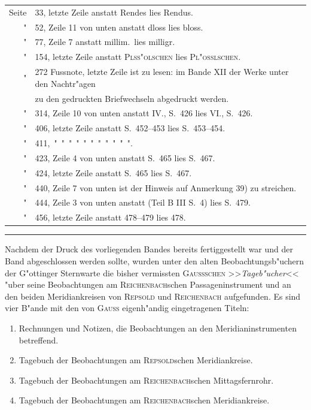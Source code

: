 \documentclass[12pt,a4paper]{article}
\theoremstyle{plain}
\theoremstyle{definition}
\theoremstyle{remark}
\begin{document}
\begin{tabular}{r@{\ }l}
Seite & 33, letzte Zeile anstatt Rendes lies Rendus. \\
\quad" & 52, Zeile 11 von unten anstatt dloss lies bloss. \\
\quad" & 77, Zeile 7 anstatt millim.\ lies milligr. \\
\quad" & 154, letzte Zeile anstatt \textsc{Plss"olschen} lies \textsc{Pl"osslschen}. \\
\quad" & 272 Fussnote, letzte Zeile ist zu lesen: im Bande XII der Werke unter den Nachtr"agen \\
& \qquad zu den gedruckten Briefwechseln abgedruckt werden. \\
\quad" & 314, Zeile 10 von unten anstatt IV., S.~426 lies VI., S.~426. \\
\quad" & 406, letzte Zeile anstatt S.~452--453 lies S.~453--454. \\
\quad" & 411, \quad\," \quad\," \quad\," \quad\," \quad\," \quad\," \quad\," \quad\," \quad\," \quad\," \quad\,". \\
\quad" & 423, Zeile 4 von unten anstatt S.~465 lies S.~467. \\
\quad" & 424, letzte Zeile anstatt S.~465 lies S.~467. \\
\quad" & 440, Zeile 7 von unten ist der Hinweis auf Anmerkung 39) zu streichen. \\
\quad" & 444, Zeile 3 von unten anstatt (Teil B III S.~4) lies S.~479. \\
\quad" & 456, letzte Zeile anstatt 478--479 lies 478.
\end{tabular}

\vspace{1em}
\hrule
\vspace{1em}

Nachdem der Druck des vorliegenden Bandes bereits fertiggestellt war und der Band abgeschlossen
werden sollte, wurden unter den alten Beobachtungsb"uchern der G"ottinger Sternwarte die bisher vermissten
\textsc{Gaussschen} >>\textit{Tageb"ucher}<< "uber seine Beobachtungen am \textsc{Reichenbach}schen Passageninstrument und an
den beiden Meridiankreisen von \textsc{Repsold} und \textsc{Reichenbach} aufgefunden. Es sind vier B"ande mit den
von \textsc{Gauss} eigenh"andig eingetragenen Titeln:

\begin{enumerate}[label=\arabic*)]
\item Rechnungen und Notizen, die Beobachtungen an den Meridianinstrumenten betreffend.
\item Tagebuch der Beobachtungen am \textsc{Repsold}schen Meridiankreise.
\item Tagebuch der Beobachtungen am \textsc{Reichenbach}schen Mittagsfernrohr.
\item Tagebuch der Beobachtungen am \textsc{Reichenbach}schen Meridiankreise.
\end{enumerate}
\end{document}
